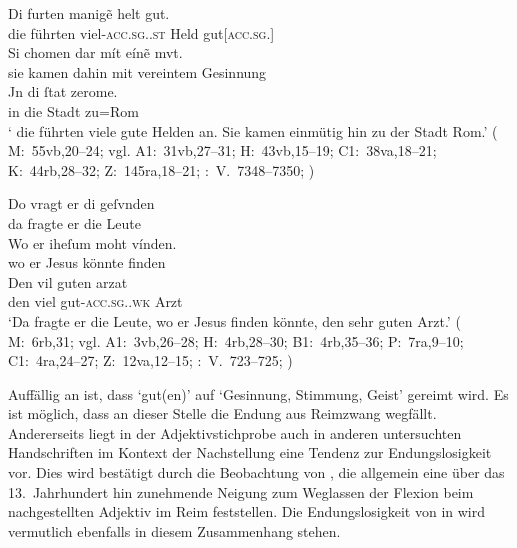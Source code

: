 \begin{exe}
\ex \label{ex:maccadj}
	\begin{xlist}
	\ex \label{ex:maccadj_1}
		\gll Di furten manigẽ helt gut. \\
			die führten viel-\textsc{acc.sg.\MascM.st} Held
			gut[\textsc{acc.sg.\MascM}] \\
	\sn \gll Si chomen dar mít eínẽ mvt. \\
			sie kamen dahin mit vereintem Gesinnung \\
	\sn \gll Jn di ſtat zerome. \\
			in die Stadt zu=Rom \\
		\trans `\textelp{} die führten viele gute Helden an. Sie kamen einmütig
			hin zu der Stadt Rom.'
			(%
				M:~55vb,20--24; vgl.
				A1:~31vb,27--31;
				H:~43vb,15--19;
				C1:~38va,18--21;
				K:~44rb,28--32;
				Z:~145ra,18--21;
				\KC:~V.~7348--7350;
				\cite[216]{schroeder1895}%
			)

	\ex \label{ex:maccadj_2}
		\gll Do vragt er di geſvnden \\
			da fragte er die Leute \\
	\sn \gll Wo er iheſum moht vínden. \\
			wo er Jesus könnte finden \\
	\sn \gll Den vil guten arzat \\
			den viel gut-\textsc{acc.sg.\MascM.wk} Arzt \\
		\trans `Da fragte er die Leute, wo er Jesus finden
			könnte, den sehr guten Arzt.'
			(%
				M:~6rb,31; vgl.
				A1:~3vb,26--28;
				H:~4rb,28--30;
				B1:~4rb,35--36;
				P:~7ra,9--10;
				C1:~4ra,24--27;
				Z:~12va,12--15;
				\KC:~V.~723--725;
				\cite[94]{schroeder1895}%
			)
		\\
	\end{xlist}
\end{exe}

Auffällig an  ist, dass  `gut(en)' auf
 `Gesinnung, Stimmung, Geist' gereimt wird. Es ist möglich, dass an
dieser Stelle die Endung aus Reimzwang wegfällt. Andererseits liegt in der
Adjektivstichprobe auch in anderen untersuchten Handschriften im Kontext der
Nachstellung eine Tendenz zur Endungslosigkeit vor. Dies wird bestätigt durch
die Beobachtung von \citet[241]{ksw2}, die allgemein eine über das
13.~Jahrhundert hin zunehmende Neigung zum Weglassen der Flexion beim
nachgestellten Adjektiv im Reim feststellen. Die
Endungslosigkeit von  in  wird vermutlich
ebenfalls in diesem Zusammenhang stehen.


